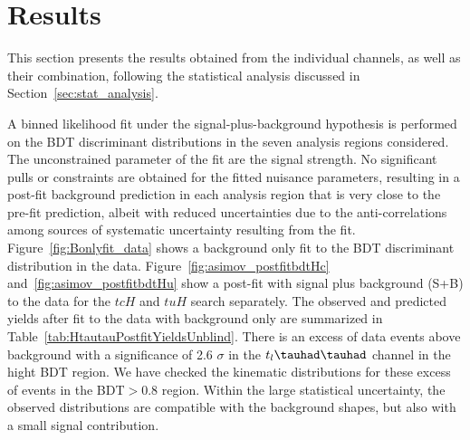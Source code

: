 \section{Results}
\label{sec:result}

This section presents the results obtained from the individual channels, as well as their combination,
following the statistical analysis discussed in Section~\ref{sec:stat_analysis}.

A binned likelihood fit under the signal-plus-background hypothesis is performed on the BDT discriminant distributions in the seven 
analysis regions considered. The unconstrained parameter of the fit are the signal 
strength.
No significant pulls or constraints are obtained for the fitted nuisance parameters, resulting in a post-fit background prediction in each analysis region that is
very close to the pre-fit prediction, albeit with reduced uncertainties due to the anti-correlations among sources of systematic uncertainty resulting from the fit.
Figure~\ref{fig:Bonlyfit_data} shows a background only fit to the BDT discriminant distribution in the data.
Figure~\ref{fig:asimov_postfitbdtHc} and~\ref{fig:asimov_postfitbdtHu} show a post-fit with signal plus background (S+B) to the data for
the $tcH$ and $tuH$ search separately.
The observed and predicted yields after fit to the data with background only are summarized in Table~\ref{tab:HtautauPostfitYieldsUnblind}.
There is an excess of data events above background with a significance of 2.6 $\sigma$ in the $t_l\thadhad$ channel in the hight BDT region.
We have checked the kinematic distributions for these excess of events in
the BDT$>0.8$ region. Within the large statistical uncertainty, the observed distributions are compatible with the background shapes, but also with a small signal
contribution.

